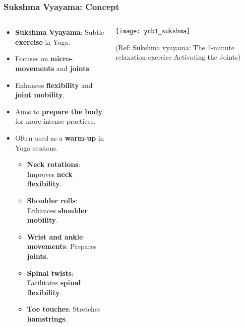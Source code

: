 \begin{frame}[fragile]\frametitle{Sukshma Vyayama: Concept}
\begin{columns}
    \begin{column}[T]{0.5\linewidth}
      \begin{itemize}
        \item \textbf{Sukshma Vyayama}: Subtle \textbf{exercise} in Yoga.
        \item Focuses on \textbf{micro-movements} and \textbf{joints}.
        \item Enhances \textbf{flexibility} and \textbf{joint mobility}.
        \item Aims to \textbf{prepare the body} for more intense practices.
        \item Often used as a \textbf{warm-up} in Yoga sessions.
		  \begin{itemize}
			\item \textbf{Neck rotations}: Improves \textbf{neck flexibility}.
			\item \textbf{Shoulder rolls}: Enhances \textbf{shoulder mobility}.
			\item \textbf{Wrist and ankle movements}: Prepares \textbf{joints}.
			\item \textbf{Spinal twists}: Facilitates \textbf{spinal flexibility}.
			\item \textbf{Toe touches}: Stretches \textbf{hamstrings}.
		  \end{itemize}		
      \end{itemize}
    \end{column}
    \begin{column}[T]{0.5\linewidth}
        \begin{center}
			\texttt{[image: ycb1\_sukshma]}
				
			{\tiny (Ref: Sukshma vyayama: The 7-minute relaxation exercise Activating the Joints)}		
        \end{center}	
    \end{column}
\end{columns}
\end{frame}

